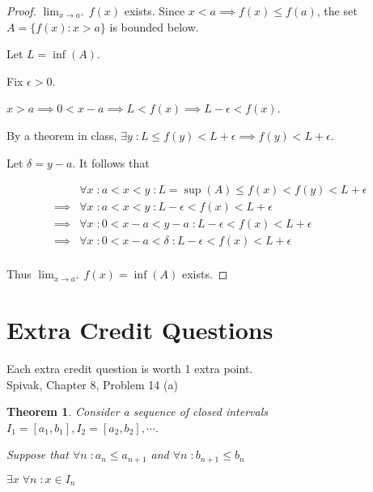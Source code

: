 \documentclass{article} %
\theoremstyle{plain}
\newtheorem*{theorem*}{Theorem}
\theoremstyle{definition}
\begin{document}
\begin{proof} $\lim_{x \to a^+} f(x)$ exists. 
    Since $x<a \implies f(x) \leq f(a)$, the set $A = \{f(x) : x > a \}$ is bounded below.

    Let $L = \inf(A)$.

    Fix $\epsilon > 0$.

    $x > a \implies 0 < x-a \implies L < f(x) \implies L - \epsilon < f(x)$.

    By a theorem in class, $\exists y \; \colon L \leq f(y) < L + \epsilon \implies f(y) < L + \epsilon$.

    Let $\delta = y-a$. It follows that

    \begin{align*}
        & \forall x \; \colon a < x < y \; \colon L = \sup(A) \leq f(x) < f(y) < L + \epsilon \\
        \implies & \forall x \; \colon a < x < y \; \colon L - \epsilon < f(x) < L + \epsilon \\
        \implies & \forall x \; \colon 0 < x-a < y-a \; \colon L - \epsilon < f(x) < L + \epsilon \\
        \implies & \forall x \; \colon 0 < x-a < \delta \; \colon L - \epsilon < f(x) < L + \epsilon \\
    \end{align*}

    Thus $\lim_{x \to a^+} f(x) = \inf(A)$ exists.
\end{proof} 


\section{Extra Credit Questions} 

Each extra credit question is worth 1 extra point. \\

\noindent{} Spivak, Chapter 8, Problem 14 (a)

\begin{theorem*} Consider a sequence of closed intervals $I_1 = [a_1, b_1], I_2 = [a_2, b_2], \cdots$.

    Suppose that $\forall n \; \colon a_n \leq a_{n+1}$ and $\forall n \; \colon b_{n+1} \leq b_{n}$

    $\exists x \; \forall n \; \colon x \in I_n$
\end{theorem*}
\end{document}
